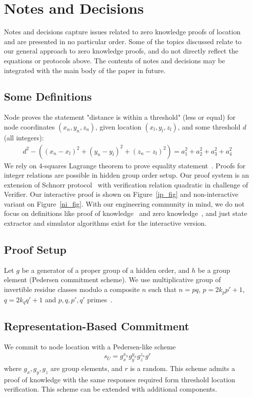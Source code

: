 \documentclass{article}
\begin{document}
\section{Notes and Decisions}

Notes and decisions capture issues related to zero knowledge proofs of location and are presented in no particular order.
Some of the topics discussed relate to our general approach to zero knowledge proofs, and do not directly reflect the equations or protocols above.
The contents of notes and decisions may be integrated with the main body of the paper in future. 


\subsection{Some Definitions}
\label{sect-definitions}
Node proves the statement "distance is within a threshold" (less or equal)
for node coordinates $(x_n, y_n, z_n)$,
given location $(x_l, y_l, z_l)$,
and some threshold $d$ (all integers):
\begin{gather}
\label{eq-distn-cp}
  d^2 - ((x_n - x_l)^2 + (y_n - y_l)^2 + (z_n - z_l)^2) = a_1^2 + a_2^2 + a_3^2 + a_4^2
\end{gather}
We rely on 4-squares Lagrange theorem to prove equality statement~\cite{Lipmaa03}.
Proofs for integer relations are possible in hidden group order setup.
Our proof system is an extension of Schnorr protocol~\cite{Schnorr91}
with verification relation quadratic in challenge of Verifier.
Our interactive proof is shown on Figure~\ref{ip_fig}
and non-interactive variant on Figure~\ref{ni_fig}.
With our engineering community in mind, we do not focus on definitions like
proof of knowledge~\cite{BellarePoK}
and zero knowledge~\cite{Goldwasser85,GMW},
and just state extractor and simulator algorithms exist for the interactive version.

\subsection{Proof Setup}

Let $g$ be a generator of a proper group of a hidden order,
and $h$ be a group element (Pedersen commitment scheme).
We use multiplicative group of invertible residue classes modulo a composite $n$ such that
$n=pq$, $p=2 k_p p'+1$, $q=2 k_q q'+1$ and $p, q, p', q'$ primes~\cite{Idemix}.

\subsection{Representation-Based Commitment}
We commit to node location with a Pedersen-like scheme~\cite{PedersenCommit,BrandsPKIbook}
\begin{gather}
\label{cmt-up-cp}
  s_U = g_x^{x_n} g_y^{y_n} g_z^{z_n} g^{r}
\end{gather}
where $g_x, g_y, g_z$ are group elements, and $r$ is a random.
This scheme admits a proof of knowledge with the same responses required form threshold location verification.
This scheme can be extended with additional components. %
\end{document}
